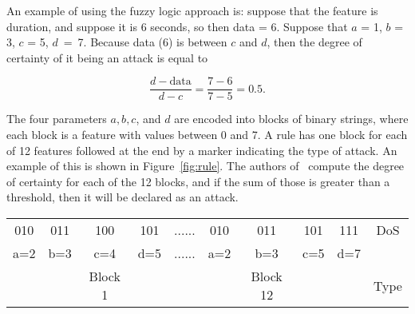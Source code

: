 \documentclass{sig-alternate}
\begin{document}
\begin{algorithm}[t]
\caption{Fuzzy Algorithm that is based on an algorithm used in~\cite{6496342, 6559603}, but a few corrections have been made. Also see Figure~\ref{fig:trapFigure}.}
\label{alg:fuzAlg}
\begin{algorithmic}
\ELSE {}
\ENDIF
\end{algorithmic}
\end{algorithm}

An example of using the fuzzy logic approach is: suppose that the feature is duration, and suppose it is 6 seconds, so then data = 6. Suppose that $a$ = 1, $b$ = 3, $c$ = 5, $d$~=~7. Because data (6) is between $c$ and $d$, then the degree of certainty of it being an attack is equal to

\begin{equation*}
\frac{d-\textrm{data}}{d-c} = \frac{7-6}{7-5} = 0.5.
\end{equation*}

The four parameters $a, b, c$, and $d$ are encoded into blocks of binary strings, where each block is a feature with values between 0 and 7. 
A rule has one block for each of 12 features followed at the end by a marker indicating the type of attack. An example of this is shown in Figure~\ref{fig:rule}. The authors of~\cite{6496342, 6559603} compute the degree of certainty for each of the 12 blocks, and if the sum of those is greater than a threshold, then it will be declared as an attack.


\begin{figure*}
\centering
\caption{A rule with 12 blocks of features used in~\cite{6496342, 6559603}.}
\vspace{0.20cm}
\begin{tabular}{|cccc|c|cccc|c|} \hline
010 & 011 & 100 & 101   & ...... & 010 & 011 & 101 & 111   & DoS\\
a=2 & b=3 & c=4 & d=5   & ...... & a=2 & b=3 & c=5 & d=7   &\\ 
    &     & Block 1&    &        &     & Block 12& &       & Type\\
\hline\end{tabular}
\label{fig:rule}
\end{figure*}
\end{document}
